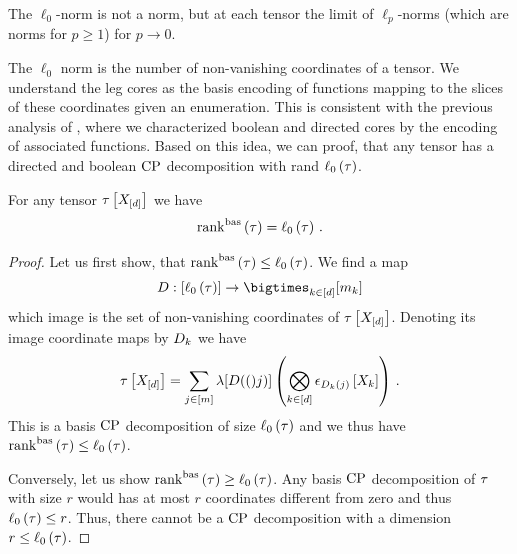The $\ell_0$-norm is not a norm, but at each tensor the limit of $\ell_p$-norms (which are norms for $p\geq1$) for $p \rightarrow 0$.


The $\ell_0$ norm is the number of non-vanishing coordinates of a tensor.
We understand the leg cores as the basis encoding of functions mapping to the slices of these coordinates given an enumeration.
This is consistent with the previous analysis of , where we characterized boolean and directed cores by the encoding of associated functions.
Based on this idea, we can proof, that any tensor has a directed and boolean $\mathrm{CP}$ decomposition with rand $\ell_0\left(\tau\right)$.


\begin{theorem}
    \label{the:sparseBasisCP}
    For any tensor $\tau\left[X_{[d]}\right]$ we have
    \begin{align*}
        \mathrm{rank}^{\mathrm{bas}}\left(\tau\right) = \ell_0\left(\tau\right) \, .
    \end{align*}
\end{theorem}
\begin{proof}
    Let us first show, that $\mathrm{rank}^{\mathrm{bas}}\left(\tau\right) \leq \ell_0\left(\tau\right)$.
    We find a map
    \begin{align*}
        \datamap : [\sparsityof{\hypercore}] \rightarrow  \facstates
    \end{align*}
    which image is the set of non-vanishing coordinates of $\tau\left[X_{[d]}\right]$.
    Denoting its image coordinate maps by $D_{k}$ we have
    \begin{align*}
        \tau\left[X_{[d]}\right]
        = \sum_{j\in[m]} \lambda[D(()j)] \left(\bigotimes_{k\in[d]} \epsilon_{D_{k}(j)}\left[X_{k}\right] \right) \, .
    \end{align*}
    This is a basis $\mathrm{CP}$ decomposition of size $\ell_0\left(\tau\right)$ and we thus have $\mathrm{rank}^{\mathrm{bas}}\left(\tau\right)\leq\ell_0\left(\tau\right)$.

    Conversely, let us show $\mathrm{rank}^{\mathrm{bas}}\left(\tau\right) \geq \ell_0\left(\tau\right)$.
    Any basis $\mathrm{CP}$ decomposition of $\tau$ with size $r$ would has at most $r$ coordinates different from zero and thus $\ell_0\left(\tau\right)\leq r$.
    Thus, there cannot be a $\mathrm{CP}$ decomposition with a dimension $r\leq\ell_0\left(\tau\right)$.
\end{proof}

